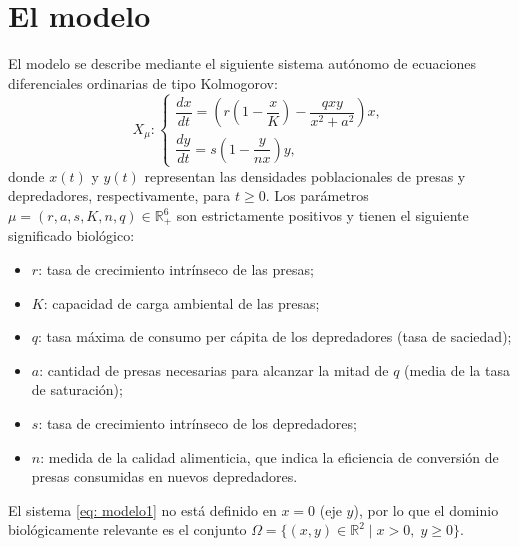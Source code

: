 \documentclass[]{article}
\theoremstyle{remark}
\begin{document}
	\section{El modelo}
	El modelo se describe mediante el siguiente sistema autónomo de ecuaciones diferenciales ordinarias de tipo Kolmogorov:
	\begin{equation}
		X_{\mu}:
		\begin{cases}
			\dfrac{dx}{dt} = \left(r \left(1 - \dfrac{x}{K}\right) - \dfrac{q x y}{x^2 + a^2}\right) x, \\
			\dfrac{dy}{dt} = s \left(1 - \dfrac{y}{n x}\right) y,
		\end{cases}
		\label{eq: modelo1}
	\end{equation}
	donde $x(t)$ y $y(t)$ representan las densidades poblacionales de presas y depredadores, respectivamente, para $t \geq 0$. Los parámetros $\mu = (r, a, s, K, n, q) \in \mathbb{R}^6_{+}$ son estrictamente positivos y tienen el siguiente significado biológico:
	\begin{itemize}
		\item $r$: tasa de crecimiento intrínseco de las presas;
		\item $K$: capacidad de carga ambiental de las presas;
		\item $q$: tasa máxima de consumo per cápita de los depredadores (tasa de saciedad);
		\item $a$: cantidad de presas necesarias para alcanzar la mitad de $q$ (media de la tasa de saturación);
		\item $s$: tasa de crecimiento intrínseco de los depredadores;
		\item $n$: medida de la calidad alimenticia, que indica la eficiencia de conversión de presas consumidas en nuevos depredadores.
	\end{itemize}
	El sistema \eqref{eq: modelo1} no está definido en $x=0$ (eje $y$), por lo que el dominio biológicamente relevante es el conjunto $\Omega = \{ (x,y) \in \mathbb{R}^2 \mid x > 0, \; y \geq 0 \}$. \\
	
\end{document}
